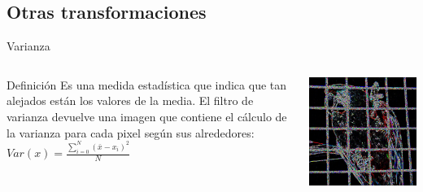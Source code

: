 \documentclass{beamer}
\begin{document}
\subsection{Otras transformaciones}


\begin{frame}{Varianza}
\begin{columns}
\column[t]{5cm}

\begin{center}
\begin{block}{Definición}
\justifying
Es una medida estadística que indica que tan alejados están los valores de la media. El filtro de varianza devuelve una imagen que contiene el cálculo de la varianza para cada pixel según sus alrededores:\\

\begin{math}
Var(x)= \frac{\sum \limits_{i=0}^{N} (\bar x - x_i)^2}{N}
\end{math}
\end{block}
\end{center}

\column[t]{5cm}

\begin{center}
\includegraphics[scale=0.30]{./.Presentation/variance_parrot.png}
\end{center}

\end{columns}

\end{frame}
\end{document}
